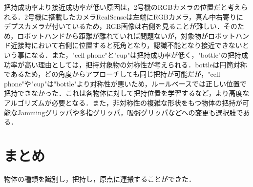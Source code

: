 把持成功率より接近成功率が低い原因は，2号機のRGBカメラの位置だと考えられる．2号機に搭載したカメラRealSenseは左端にRGBカメラ，真ん中右寄りにデプスカメラが付いているため，RGB画像は右側を見ることが難しい．そのため，ロボットハンドから距離が離れていれば問題ないが，対象物がロボットハンド近接時において右側に位置すると死角となり，認識不能となり接近できないという事になる．また，"cell phone"と"cup"は把持成功率が低く，"bottle"の把持成功率が高い理由としては，把持対象物の対称性が考えられる．bottleは円筒対称であるため，どの角度からアプローチしても同じ把持が可能だが，"cell phone"や"cup"は"bottle"より対称性が悪いため，ルールベースでは正しい位置で把持できなかった．これは各物体に対して把持位置を学習するなど，より高度なアルゴリズムが必要となる．また，非対称性の複雑な形状をもつ物体の把持が可能なJammingグリッパや多指グリッパ，吸盤グリッパなどへの変更も選択肢である．

\section{まとめ}
物体の種類を識別し，把持し，原点に運搬することができた．



